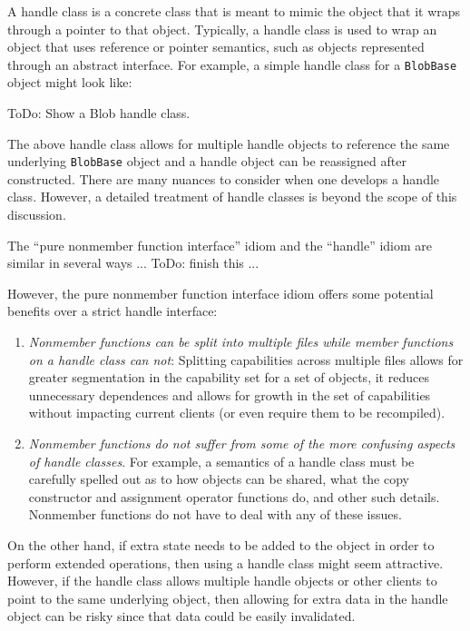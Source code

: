 \documentclass[pdf,ps2pdf,11pt]{SANDreport}
\begin{document}
A handle class is a concrete class that is meant to mimic the object that it
wraps through a pointer to that object.  Typically, a handle class is used to
wrap an object that uses reference or pointer semantics, such as objects
represented through an abstract interface.  For example, a simple handle class
for a {}\texttt{BlobBase} object might look like:

ToDo: Show a Blob handle class.

The above handle class allows for multiple handle objects to reference the
same underlying {}\texttt{BlobBase} object and a handle object can be
reassigned after constructed.  There are many nuances to consider when one
develops a handle class.  However, a detailed treatment of handle classes is
beyond the scope of this discussion.

The ``pure nonmember function interface'' idiom and the ``handle'' idiom are
similar in several ways ... ToDo: finish this ...

However, the pure nonmember function interface idiom offers some potential
benefits over a strict handle interface:

\begin{enumerate}

{}\item{}\textit{Nonmember functions can be split into multiple files while
member functions on a handle class can not}: Splitting capabilities across
multiple files allows for greater segmentation in the capability set for a set
of objects, it reduces unnecessary dependences and allows for growth in the
set of capabilities without impacting current clients (or even require them to
be recompiled).

{}\item{}\textit{Nonmember functions do not suffer from some of the more
confusing aspects of handle classes}.  For example, a semantics of a handle
class must be carefully spelled out as to how objects can be shared, what the
copy constructor and assignment operator functions do, and other such details.
Nonmember functions do not have to deal with any of these issues.

\end{enumerate}

On the other hand, if extra state needs to be added to the object in order to
perform extended operations, then using a handle class might seem attractive.
However, if the handle class allows multiple handle objects or other clients
to point to the same underlying object, then allowing for extra data in the
handle object can be risky since that data could be easily invalidated.
\end{document}
